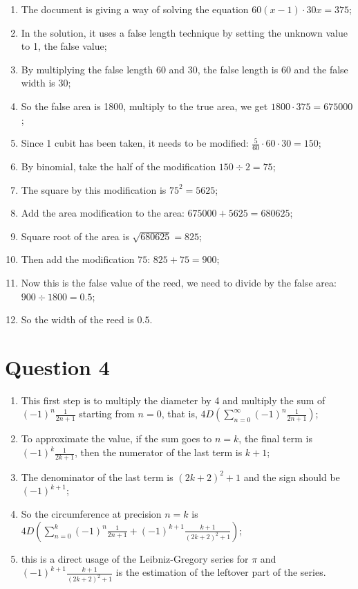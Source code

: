 \documentclass{article}
\begin{document}
\begin{enumerate}
    \item The document is giving a way of solving the equation $60(x-1)\cdot 30x=375$;
    \item In the solution, it uses a false length technique by setting the unknown value to 1, the false value;
    \item By multiplying the false length 60 and 30, the false length is 60 and the false width is 30;
    \item So the false area is 1800, multiply to the true area, we get $1800\cdot 375=675000$;
    \item Since 1 cubit has been taken, it needs to be modified: $\frac{5}{60}\cdot 60\cdot 30=150$;
    \item By binomial, take the half of the modification $150\div 2=75$;
    \item The square by this modification is $75^2=5625$;
    \item Add the area modification to the area: $675000+5625=680625$;
    \item Square root of the area is $\sqrt{680625}=825$;
    \item Then add the modification $75$: $825+75=900$;
    \item Now this is the false value of the reed, we need to divide by the false area: $900\div 1800=0.5$;
    \item So the width of the reed is $0.5$.
\end{enumerate}

\newpage

\section*{Question 4}

\begin{enumerate}
    \item This first step is to multiply the diameter by 4 and multiply the sum of $(-1)^n\frac{1}{2n+1}$ starting from $n=0$, that is, $4D\left(\sum_{n=0}^{\infty}(-1)^n\frac{1}{2n+1}\right)$;
    \item To approximate the value, if the sum goes to $n=k$, the final term is $(-1)^k\frac{1}{2k+1}$, then the numerator of the last term is $k+1$;
    \item The denominator of the last term is $(2k+2)^2+1$ and the sign should be $(-1)^{k+1}$;
    \item So the circumference at precision $n=k$ is $4D\left(\sum_{n=0}^{k}(-1)^n\frac{1}{2n+1}+(-1)^{k+1}\frac{k+1}{(2k+2)^2+1}\right)$;
    \item this is a direct usage of the Leibniz-Gregory series for $\pi$ and $(-1)^{k+1}\frac{k+1}{(2k+2)^2+1}$ is the estimation of the leftover part of the series.
\end{enumerate}
\end{document}

